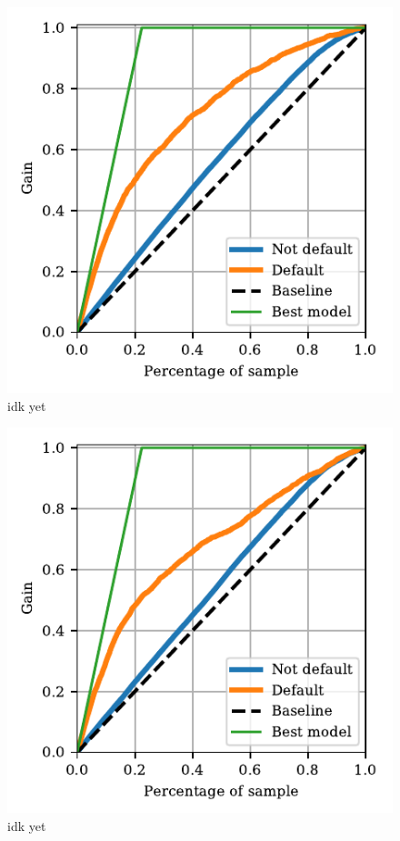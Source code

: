 \documentclass[a4paper, 11pt, twocolumn]{article}
\begin{document}
\begin{figure}[H]
	\includegraphics[scale=1]{figures/cumulative_gain_NN.pdf}
	\caption{idk yet}
\end{figure}

\begin{figure}[H]
	\includegraphics[scale=1]{figures/cumulative_gain_logreg.pdf}
	\caption{idk yet}
\end{figure}
\end{document}
